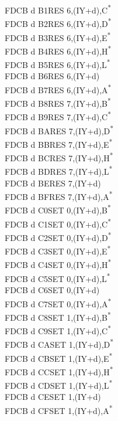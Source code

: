 \documentclass[twoside,openright,a4paper]{book}
\begin{document}
\begin{multicols}{3}
{\begin{tabbing}
	FDCB d B1\>RES 6,(IY+d),C\textsuperscript{*}\\
	FDCB d B2\>RES 6,(IY+d),D\textsuperscript{*}\\
	FDCB d B3\>RES 6,(IY+d),E\textsuperscript{*}\\
	FDCB d B4\>RES 6,(IY+d),H\textsuperscript{*}\\
	FDCB d B5\>RES 6,(IY+d),L\textsuperscript{*}\\
	FDCB d B6\>RES 6,(IY+d)\\
	FDCB d B7\>RES 6,(IY+d),A\textsuperscript{*}\\
	FDCB d B8\>RES 7,(IY+d),B\textsuperscript{*}\\
	FDCB d B9\>RES 7,(IY+d),C\textsuperscript{*}\\
	FDCB d BA\>RES 7,(IY+d),D\textsuperscript{*}\\
	FDCB d BB\>RES 7,(IY+d),E\textsuperscript{*}\\
	FDCB d BC\>RES 7,(IY+d),H\textsuperscript{*}\\
	FDCB d BD\>RES 7,(IY+d),L\textsuperscript{*}\\
	FDCB d BE\>RES 7,(IY+d)\\
	FDCB d BF\>RES 7,(IY+d),A\textsuperscript{*}\\
	FDCB d C0\>SET 0,(IY+d),B\textsuperscript{*}\\
	FDCB d C1\>SET 0,(IY+d),C\textsuperscript{*}\\
	FDCB d C2\>SET 0,(IY+d),D\textsuperscript{*}\\
	FDCB d C3\>SET 0,(IY+d),E\textsuperscript{*}\\
	FDCB d C4\>SET 0,(IY+d),H\textsuperscript{*}\\
	FDCB d C5\>SET 0,(IY+d),L\textsuperscript{*}\\
	FDCB d C6\>SET 0,(IY+d)\\
	FDCB d C7\>SET 0,(IY+d),A\textsuperscript{*}\\
	FDCB d C8\>SET 1,(IY+d),B\textsuperscript{*}\\
	FDCB d C9\>SET 1,(IY+d),C\textsuperscript{*}\\
	FDCB d CA\>SET 1,(IY+d),D\textsuperscript{*}\\
	FDCB d CB\>SET 1,(IY+d),E\textsuperscript{*}\\
	FDCB d CC\>SET 1,(IY+d),H\textsuperscript{*}\\
	FDCB d CD\>SET 1,(IY+d),L\textsuperscript{*}\\
	FDCB d CE\>SET 1,(IY+d)\\
	FDCB d CF\>SET 1,(IY+d),A\textsuperscript{*}\\

\end{tabbing}}
\end{multicols}
\end{document}
